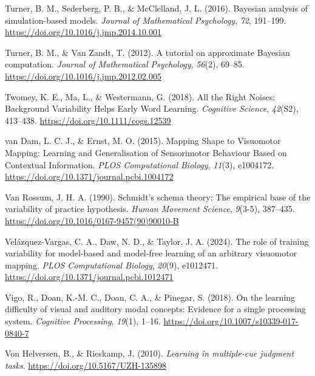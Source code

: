 \documentclass[
  11pt,
  letterpaper,
]{article}
\newlength{\cslhangindent}
\newenvironment{CSLReferences}[2] %
 {\begin{list}{}{%
  \setlength{\itemindent}{0pt}
  \setlength{\leftmargin}{0pt}
  \setlength{\parsep}{0pt}
  \ifodd #1
   \setlength{\leftmargin}{\cslhangindent}
   \setlength{\itemindent}{-1\cslhangindent}
  \fi
  \setlength{\itemsep}{#2\baselineskip}}}
 {\end{list}}
\begin{document}
\begin{CSLReferences}{1}{0}
Turner, B. M., Sederberg, P. B., \& McClelland, J. L. (2016). Bayesian
analysis of simulation-based models. \emph{Journal of Mathematical
Psychology}, \emph{72}, 191--199.
\url{https://doi.org/10.1016/j.jmp.2014.10.001}

Turner, B. M., \& Van Zandt, T. (2012). A tutorial on approximate
{Bayesian} computation. \emph{Journal of Mathematical Psychology},
\emph{56}(2), 69--85. \url{https://doi.org/10.1016/j.jmp.2012.02.005}

Twomey, K. E., Ma, L., \& Westermann, G. (2018). All the {Right Noises}:
{Background Variability Helps Early Word Learning}. \emph{Cognitive
Science}, \emph{42}(S2), 413--438.
\url{https://doi.org/10.1111/cogs.12539}

van Dam, L. C. J., \& Ernst, M. O. (2015). Mapping {Shape} to
{Visuomotor Mapping}: {Learning} and {Generalisation} of {Sensorimotor
Behaviour Based} on {Contextual Information}. \emph{PLOS Computational
Biology}, \emph{11}(3), e1004172.
\url{https://doi.org/10.1371/journal.pcbi.1004172}

Van Rossum, J. H. A. (1990). Schmidt's schema theory: The empirical base
of the variability of practice hypothesis. \emph{Human Movement
Science}, \emph{9}(3-5), 387--435.
\url{https://doi.org/10.1016/0167-9457(90)90010-B}

Velázquez-Vargas, C. A., Daw, N. D., \& Taylor, J. A. (2024). The role
of training variability for model-based and model-free learning of an
arbitrary visuomotor mapping. \emph{PLOS Computational Biology},
\emph{20}(9), e1012471.
\url{https://doi.org/10.1371/journal.pcbi.1012471}

Vigo, R., Doan, K.-M. C., Doan, C. A., \& Pinegar, S. (2018). On the
learning difficulty of visual and auditory modal concepts: {Evidence}
for a single processing system. \emph{Cognitive Processing},
\emph{19}(1), 1--16. \url{https://doi.org/10.1007/s10339-017-0840-7}

Von Helversen, B., \& Rieskamp, J. (2010). \emph{Learning in
multiple-cue judgment tasks}. \url{https://doi.org/10.5167/UZH-135898}


\end{CSLReferences}
\end{document}
